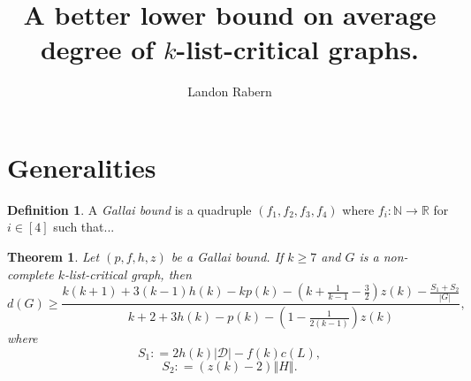 \documentclass[10pt]{article}
\title{A better lower bound on average degree of $k$-list-critical graphs.}
\author{Landon Rabern}
\theoremstyle{plain}
\newtheorem{thm}{Theorem}[section]
\theoremstyle{definition}
\newtheorem{defn}{Definition}
\theoremstyle{remark}
\newcommand{\fancy}[1]{\mathcal{#1}}
\newcommand{\IN}{\mathbb{N}}
\newcommand{\IR}{\mathbb{R}}
\newcommand{\D}{\fancy{D}}
\newcommand{\card}[1]{\left|#1\right|}
\newcommand{\size}[1]{\left\Vert#1\right\Vert}
\newcommand{\func}[3]{#1\colon #2 \rightarrow #3}
\newcommand{\irange}[1]{\left[#1\right]}
\newcommand{\parens}[1]{\left( #1 \right)}
\newcommand{\DefinedAs}{\mathrel{\mathop:}=}
\def\D{\fancy{D}}
\begin{document}
\maketitle

\section{Generalities}
\begin{defn}
A \emph{Gallai bound} is a quadruple $\parens{f_1, f_2, f_3, f_4}$ where $\func{f_i}{\IN}{\IR}$ for $i \in \irange{4}$ such that...
\end{defn}
\begin{thm}
	Let $\parens{p,f,h,z}$ be a Gallai bound.  If $k \ge 7$ and $G$ is a non-complete $k$-list-critical graph, then 
	\[d(G) \ge \frac{k(k+1) + 3(k-1)h(k) - kp(k) - \parens{k + \frac{1}{k-1} - \frac32}z(k) - \frac{S_1 + S_2}{\card{G}}}{k+2 + 3h(k) - p(k) - \parens{1 - \frac{1}{2(k-1)}}z(k)},\]
	where
	\[S_1 \DefinedAs 2h(k)\card{\D} - f(k)c(L),\]
	\[S_2 \DefinedAs (z(k) - 2)\size{H}.\]
\end{thm}
\end{document}
